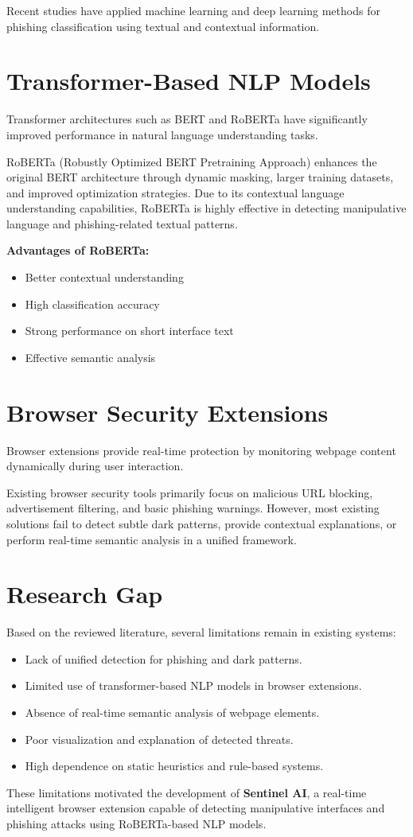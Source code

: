 \documentclass[12pt,a4paper]{report}
\begin{document}
Recent studies have applied machine learning and deep learning methods for phishing classification using textual and contextual information.

\section{Transformer-Based NLP Models}
Transformer architectures such as BERT and RoBERTa have significantly improved performance in natural language understanding tasks.

RoBERTa (Robustly Optimized BERT Pretraining Approach) enhances the original BERT architecture through dynamic masking, larger training datasets, and improved optimization strategies. Due to its contextual language understanding capabilities, RoBERTa is highly effective in detecting manipulative language and phishing-related textual patterns.

\vspace{0.5cm}
\textbf{Advantages of RoBERTa:}
\begin{itemize}
\item Better contextual understanding
\item High classification accuracy
\item Strong performance on short interface text
\item Effective semantic analysis
\end{itemize}

\section{Browser Security Extensions}
Browser extensions provide real-time protection by monitoring webpage content dynamically during user interaction.

Existing browser security tools primarily focus on malicious URL blocking, advertisement filtering, and basic phishing warnings. However, most existing solutions fail to detect subtle dark patterns, provide contextual explanations, or perform real-time semantic analysis in a unified framework.

\section{Research Gap}
Based on the reviewed literature, several limitations remain in existing systems:
\begin{itemize}
\item Lack of unified detection for phishing and dark patterns.
\item Limited use of transformer-based NLP models in browser extensions.
\item Absence of real-time semantic analysis of webpage elements.
\item Poor visualization and explanation of detected threats.
\item High dependence on static heuristics and rule-based systems.
\end{itemize}
These limitations motivated the development of \textbf{Sentinel AI}, a real-time intelligent browser extension capable of detecting manipulative interfaces and phishing attacks using RoBERTa-based NLP models.
\end{document}
